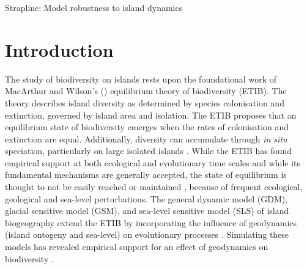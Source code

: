 \documentclass{article}
\begin{document}
Strapline: Model robustness to island dynamics

\clearpage

\section*{Introduction}

The study of biodiversity on islands rests upon the foundational work of MacArthur and Wilson’s (\citeyear{macarthur_equilibrium_1963, macarthur_theory_1967}) equilibrium theory of biodiversity (ETIB). The theory describes island diversity as determined by species colonisation and extinction, governed by island area and isolation. The ETIB proposes that an equilibrium state of biodiversity emerges when the rates of colonisation and extinction are equal. Additionally, diversity can accumulate through \textit{in situ} speciation, particularly on large isolated islands \citep{macarthur_theory_1967, losos_analysis_2000, rosindell_unified_2011, valente_simple_2020}. While the ETIB has found empirical support at both ecological \citep{simberloff_experimental_1970} and evolutionary \citep{valente_equilibrium_2017, valente_simple_2020} time scales and while its fundamental mechanisms are generally accepted, the state of equilibrium is thought to not be easily reached or maintained \citep{heaney_dynamic_2000, whittaker_general_2008, valente_effects_2014, warren_islands_2015, fernandezpalacios_towards_2016, marshall_uncertain_2016}, because of frequent ecological, geological and sea-level perturbations. The general dynamic model (GDM), glacial sensitive model (GSM), and sea-level sensitive model (SLS) of island biogeography extend the ETIB by incorporating the influence of geodynamics (island ontogeny and sea-level) on evolutionary processes \citep{whittaker_general_2008, fernandezpalacios_towards_2016, avila_towards_2019}. Simulating these models has revealed empirical support for an effect of geodynamics on biodiversity \citep{whittaker_general_2008, bunnefeld_island_2012, steinbauer_re-evaluating_2013, rijsdijk_quantifying_2014, lim_true_2017}. \\
\end{document}
